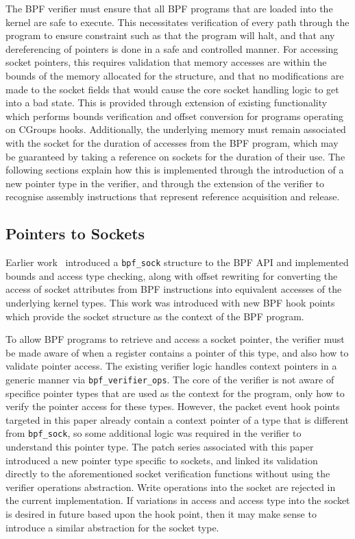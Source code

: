 \documentclass[10pt,sigconf,authorversion]{lpc}
\begin{document}

The BPF verifier must ensure that all BPF programs that are loaded into the
kernel are safe to execute. This necessitates verification of every path
through the program to ensure constraint such as that the program will halt,
and that any dereferencing of pointers is done in a safe and controlled manner.
For accessing socket pointers, this requires validation that memory accesses
are within the bounds of the memory allocated for the structure, and that no
modifications are made to the socket fields that would cause the core socket
handling logic to get into a bad state. This is provided through extension of
existing functionality which performs bounds verification and offset conversion
for programs operating on CGroups hooks. Additionally, the underlying memory
must remain associated with the socket for the duration of accesses from the
BPF program, which may be guaranteed by taking a reference on sockets for the
duration of their use. The following sections explain how this is implemented
through the introduction of a new pointer type in the verifier, and through the
extension of the verifier to recognise assembly instructions that represent
reference acquisition and release.

\subsection{Pointers to Sockets}

Earlier work~\cite{bpf-sock} introduced a \verb+bpf_sock+ structure to the BPF
API and implemented bounds and access type checking, along with offset
rewriting for converting the access of socket attributes from BPF instructions
into equivalent accesses of the underlying kernel types. This work was
introduced with new BPF hook points which provide the socket structure as the
context of the BPF program.

To allow BPF programs to retrieve and access a socket pointer, the verifier
must be made aware of when a register contains a pointer of this type, and also
how to validate pointer access. The existing verifier logic handles context
pointers in a generic manner via \verb+bpf_verifier_ops+. The core of the
verifier is not aware of specifice pointer types that are used as the context
for the program, only how to verify the pointer access for these types.
However, the packet event hook points targeted in this paper already contain a
context pointer of a type that is different from \verb+bpf_sock+, so some
additional logic was required in the verifier to understand this pointer type.
The patch series associated with this paper introduced a new pointer type
specific to sockets, and linked its validation directly to the aforementioned
socket verification functions without using the verifier operations
abstraction. Write operations into the socket are rejected in the current
implementation. If variations in access and access type into the socket is
desired in future based upon the hook point, then it may make sense to
introduce a similar abstraction for the socket type.
\end{document}
